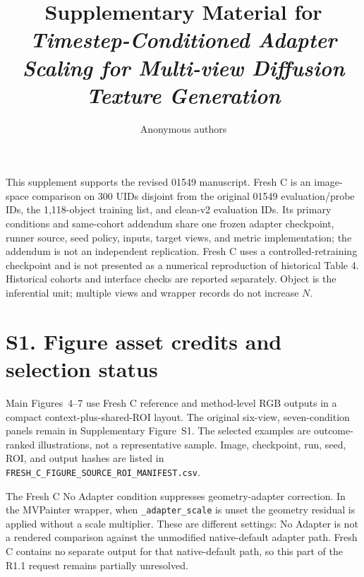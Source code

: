 \documentclass[11pt]{article}
\title{Supplementary Material for\\\emph{Timestep-Conditioned Adapter Scaling for Multi-view Diffusion Texture Generation}}
\author{Anonymous authors}
\date{}
\begin{document}
\maketitle
\noindent This supplement supports the revised 01549 manuscript. Fresh C is an image-space comparison on 300 UIDs disjoint from the original 01549 evaluation/probe IDs, the 1,118-object training list, and clean-v2 evaluation IDs. Its primary conditions and same-cohort addendum share one frozen adapter checkpoint, runner source, seed policy, inputs, target views, and metric implementation; the addendum is not an independent replication. Fresh C uses a controlled-retraining checkpoint and is not presented as a numerical reproduction of historical Table 4. Historical cohorts and interface checks are reported separately. Object is the inferential unit; multiple views and wrapper records do not increase $N$.

\section*{S1. Figure asset credits and selection status}
Main Figures~4--7 use Fresh C reference and method-level RGB outputs in a compact context-plus-shared-ROI layout. The original six-view, seven-condition panels remain in Supplementary Figure~S1. The selected examples are outcome-ranked illustrations, not a representative sample. Image, checkpoint, run, seed, ROI, and output hashes are listed in \texttt{FRESH\_C\_FIGURE\_SOURCE\_ROI\_MANIFEST.csv}.

The Fresh C No Adapter condition suppresses geometry-adapter correction. In the MVPainter wrapper, when \texttt{\_adapter\_scale} is unset the geometry residual is applied without a scale multiplier. These are different settings: No Adapter is not a rendered comparison against the unmodified native-default adapter path. Fresh C contains no separate output for that native-default path, so this part of the R1.1 request remains partially unresolved.
\end{document}
